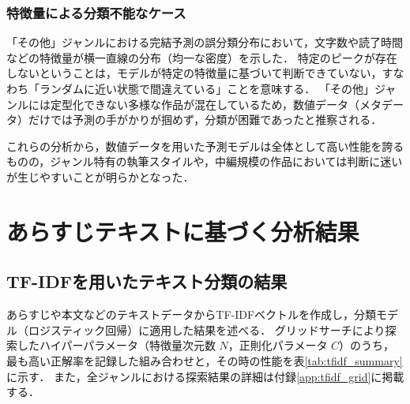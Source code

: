 \documentclass[uplatex, dvipdfmx, 11pt, a4paper, report]{jsbook}
\begin{document}
\subsubsection{特徴量による分類不能なケース}
「その他」ジャンルにおける完結予測の誤分類分布において，文字数や読了時間などの特徴量が横一直線の分布（均一な密度）を示した．
特定のピークが存在しないということは，モデルが特定の特徴量に基づいて判断できていない，すなわち「ランダムに近い状態で間違えている」ことを意味する．
「その他」ジャンルには定型化できない多様な作品が混在しているため，数値データ（メタデータ）だけでは予測の手がかりが掴めず，分類が困難であったと推察される．

これらの分析から，数値データを用いた予測モデルは全体として高い性能を誇るものの，ジャンル特有の執筆スタイルや，中編規模の作品においては判断に迷いが生じやすいことが明らかとなった．

\section{あらすじテキストに基づく分析結果}

\subsection{TF-IDFを用いたテキスト分類の結果}
あらすじや本文などのテキストデータからTF-IDFベクトルを作成し，分類モデル（ロジスティック回帰）に適用した結果を述べる．
グリッドサーチにより探索したハイパーパラメータ（特徴量次元数 $N$，正則化パラメータ $C$）のうち，最も高い正解率を記録した組み合わせと，その時の性能を表\ref{tab:tfidf_summary}に示す．
また，全ジャンルにおける探索結果の詳細は付録\ref{app:tfidf_grid}に掲載する．
\end{document}
